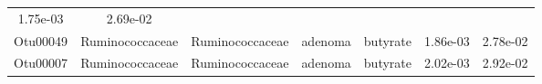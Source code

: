 \documentclass[11pt,]{article}
\begin{document}
\begin{longtable}[]{@{}ccccccc@{}}
\begin{minipage}[t]{0.09\columnwidth}
1.75e-03\strut
\end{minipage} & \begin{minipage}[t]{0.09\columnwidth}\centering\strut
2.69e-02\strut
\end{minipage}\tabularnewline
\begin{minipage}[t]{0.09\columnwidth}\centering\strut
Otu00049\strut
\end{minipage} & \begin{minipage}[t]{0.17\columnwidth}\centering\strut
Ruminococcaceae\strut
\end{minipage} & \begin{minipage}[t]{0.17\columnwidth}\centering\strut
Ruminococcaceae\strut
\end{minipage} & \begin{minipage}[t]{0.09\columnwidth}\centering\strut
adenoma\strut
\end{minipage} & \begin{minipage}[t]{0.11\columnwidth}\centering\strut
butyrate\strut
\end{minipage} & \begin{minipage}[t]{0.09\columnwidth}\centering\strut
1.86e-03\strut
\end{minipage} & \begin{minipage}[t]{0.09\columnwidth}\centering\strut
2.78e-02\strut
\end{minipage}\tabularnewline
\begin{minipage}[t]{0.09\columnwidth}\centering\strut
Otu00007\strut
\end{minipage} & \begin{minipage}[t]{0.17\columnwidth}\centering\strut
Ruminococcaceae\strut
\end{minipage} & \begin{minipage}[t]{0.17\columnwidth}\centering\strut
Ruminococcaceae\strut
\end{minipage} & \begin{minipage}[t]{0.09\columnwidth}\centering\strut
adenoma\strut
\end{minipage} & \begin{minipage}[t]{0.11\columnwidth}\centering\strut
butyrate\strut
\end{minipage} & \begin{minipage}[t]{0.09\columnwidth}\centering\strut
2.02e-03\strut
\end{minipage} & \begin{minipage}[t]{0.09\columnwidth}\centering\strut
2.92e-02\strut
\end{minipage}\tabularnewline

\end{longtable}
\end{document}
